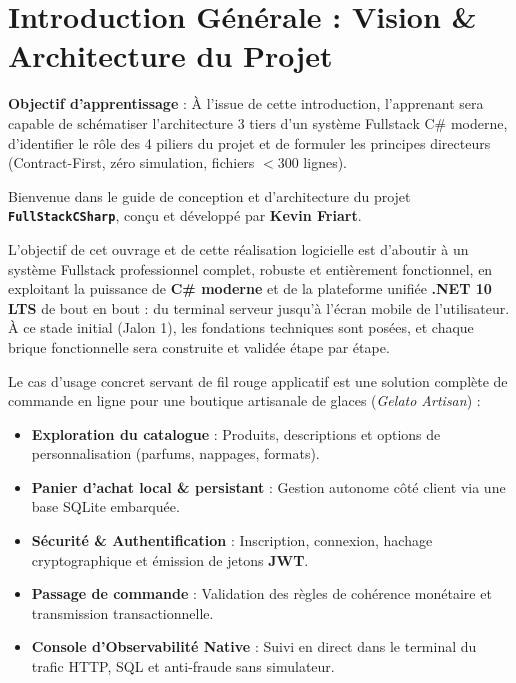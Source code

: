 \chapter*{Introduction Générale : Vision \& Architecture du Projet}

\begin{tcolorbox}[colback=indigo!4!white,colframe=indigo!40!white,arc=2mm,boxrule=0.8pt,top=2mm,bottom=2mm,left=3mm,right=3mm]
    \small\textbf{\color{indigo!90!black}Objectif d'apprentissage} : À l'issue de cette introduction, l'apprenant sera capable de schématiser l'architecture 3 tiers d'un système Fullstack C\# moderne, d'identifier le rôle des 4 piliers du projet et de formuler les principes directeurs (Contract-First, zéro simulation, fichiers $< 300$ lignes).
\end{tcolorbox}

\vspace{0.1cm}

Bienvenue dans le guide de conception et d'architecture du projet \textbf{\texttt{FullStackCSharp}}, conçu et développé par \textbf{Kevin Friart}.

L'objectif de cet ouvrage et de cette réalisation logicielle est d'aboutir à un système Fullstack professionnel complet, robuste et entièrement fonctionnel, en exploitant la puissance de \textbf{C\# moderne} et de la plateforme unifiée \textbf{.NET 10 LTS} de bout en bout : du terminal serveur jusqu'à l'écran mobile de l'utilisateur. À ce stade initial (Jalon 1), les fondations techniques sont posées, et chaque brique fonctionnelle sera construite et validée étape par étape.

Le cas d'usage concret servant de fil rouge applicatif est une solution complète de commande en ligne pour une boutique artisanale de glaces (\textit{Gelato Artisan}) :
\begin{itemize}
    \item \textbf{Exploration du catalogue} : Produits, descriptions et options de personnalisation (parfums, nappages, formats).
    \item \textbf{Panier d'achat local \& persistant} : Gestion autonome côté client via une base SQLite embarquée.
    \item \textbf{Sécurité \& Authentification} : Inscription, connexion, hachage cryptographique et émission de jetons \textbf{JWT}.
    \item \textbf{Passage de commande} : Validation des règles de cohérence monétaire et transmission transactionnelle.
    \item \textbf{Console d'Observabilité Native} : Suivi en direct dans le terminal du trafic HTTP, SQL et anti-fraude sans simulateur.
\end{itemize}

